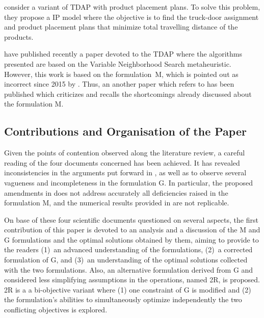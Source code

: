 \documentclass[preprint,12pt,authoryear]{elsarticle}
\begin{document}
    \citet{Kucukoglu2017} consider a variant of TDAP  with product placement plans.
    To solve this problem, they propose a IP model where the objective is to find the truck-door assignment and product placement plans that minimize total travelling distance of the products.
    

    \citet{Daquin2021} have published recently  a paper devoted to the TDAP where the algorithms presented are based on the Variable Neighborhood Search metaheuristic. 
    However, this work is based on the formulation~M, which is pointed out as incorrect since 2015 by  \citet{Gelareh2015}.
    Thus, an another paper \citep{Gelareh2021} which refers to \citep{Gelareh2015,GELAREH2016} has been published which criticizes \cite{Daquin2021} and recalls the shortcomings already discussed about the formulation M.
    
    

%
%
\subsection{Contributions and Organisation of the Paper}

Given the points of contention observed along the literature review,  a careful reading of the four documents concerned  \citep{MIAO2009,Gelareh2015,GELAREH2016,Gelareh2021} has been achieved. 
It has revealed inconsistencies in the arguments put forward in \citep{Gelareh2015,GELAREH2016,Gelareh2021}, as well as to observe several vagueness and incompleteness in the formulation G.
In particular,  the proposed  amendments in \citep{Gelareh2021} does not address accurately all  deficiencies raised in the formulation M, and the numerical results provided in \citep{GELAREH2016} are not replicable. 

On base of these four scientific documents questioned on several aspects, the first contribution of this paper is devoted to an analysis and a discussion of the M and G formulations and the optimal solutions obtained by them, aiming to provide to the readers 
(1)~an advanced understanding of the formulations, 
(2)~a corrected formulation of G, and 
(3)~an understanding of the optimal solutions collected with the two formulations.
Also,  an alternative formulation derived from G and considered less simplifying assumptions in the operations, named 2R, is proposed.
%
2R is a a bi-objective variant where 
(1) one constraint of G is modified and 
(2) the formulation's abilities to simultaneously optimize independently the two conflicting objectives is explored.
\end{document}
